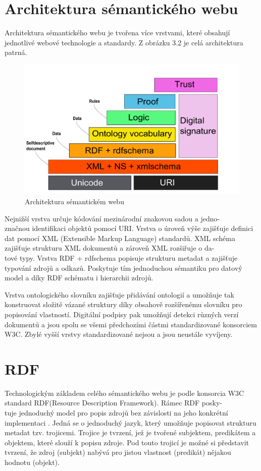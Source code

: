 \documentclass{projekt}
\begin{document}
\section{Architektura sémantického webu}
\hspace{0.65cm}Architektura sémantického webu je tvořena více vrstvami, které obsahují jednotlivé webové technologie a standardy.
Z obrázku 3.2 je celá architektura patrná. 
\begin{figure}[htb]
\begin{center}
\includegraphics[scale=0.62]{architektura.pdf}
\caption{Architektura sémantickém webu \cite{dva}}
\end{center}
\end{figure}
Nejnižší vrstva určuje kódování mezinárodní znakovou sadou a jedno-\\značnou identifikaci objektů pomocí URI. Vrstva o úroveň výše zajišťuje definici dat pomocí XML (Extensible Markup Language) standardů. XML schéma zajišťuje strukturu XML dokumentů a zároveň XML rozšiřuje o da-\\tové typy.
Vrstva RDF + rdfschema popisuje strukturu metadat a zajišťuje typování zdrojů a odkazů. Poskytuje tím jednoduchou sémantiku pro datový model a díky RDF schématu i hierarchii zdrojů.


Vrstva ontologického slovníku zajišťuje přidávání ontologií a umožňuje tak konstruovat složitě vázané struktury díky obsahově rozšířenému slovníku pro popisování vlastností. Digitální podpisy pak umožňují detekci různých verzí dokumentů a jsou spolu se všemi předchozími částmi standardizované konsorciem W3C. Zbylé vyšší vrstvy standardizované nejsou a jsou neustále vyvíjeny.

\section{RDF}
\hspace{0.65cm}Technologickým základem celého sémantického webu je podle konsorcia W3C standard RDF(Resource Description Framework). Rámec RDF posky-\\tuje jednoduchý model pro popis zdrojů bez závislosti na jeho konkrétní implementaci \cite{tri}. Jedná se o jednoduchý jazyk, který umožňuje popisovat strukturu metadat tzv. trojicemi. Trojice je tvrzení, jež je tvořené subjektem, predikátem a objektem, které slouží k popisu zdroje. Pod touto trojicí je možné si představit tvrzení, že zdroj (subjekt) nabývá pro jistou vlastnost (predikát) nějakou hodnotu (objekt).
\end{document}
